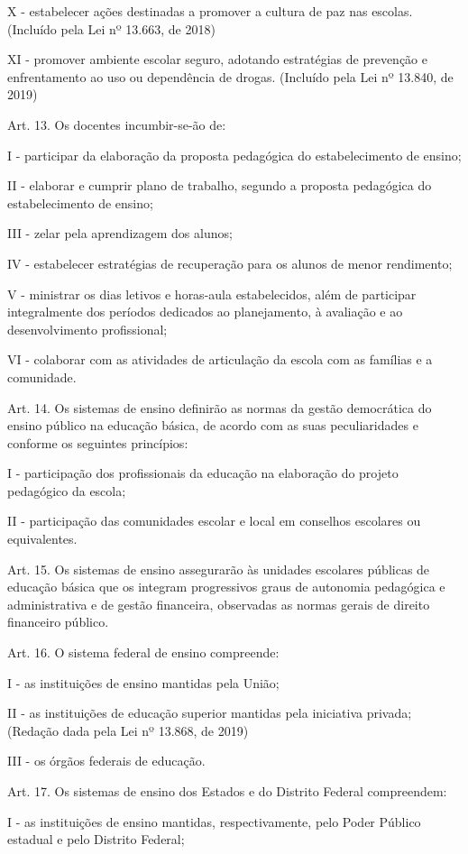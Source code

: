 \documentclass[
]{book}
\begin{document}
X - estabelecer ações destinadas a promover a cultura de paz nas escolas. (Incluído pela Lei nº 13.663, de 2018)

XI - promover ambiente escolar seguro, adotando estratégias de prevenção e enfrentamento ao uso ou dependência de drogas. (Incluído pela Lei nº 13.840, de 2019)

Art. 13. Os docentes incumbir-se-ão de:

I - participar da elaboração da proposta pedagógica do estabelecimento de ensino;

II - elaborar e cumprir plano de trabalho, segundo a proposta pedagógica do estabelecimento de ensino;

III - zelar pela aprendizagem dos alunos;

IV - estabelecer estratégias de recuperação para os alunos de menor rendimento;

V - ministrar os dias letivos e horas-aula estabelecidos, além de participar integralmente dos períodos dedicados ao planejamento, à avaliação e ao desenvolvimento profissional;

VI - colaborar com as atividades de articulação da escola com as famílias e a comunidade.

Art. 14. Os sistemas de ensino definirão as normas da gestão democrática do ensino público na educação básica, de acordo com as suas peculiaridades e conforme os seguintes princípios:

I - participação dos profissionais da educação na elaboração do projeto pedagógico da escola;

II - participação das comunidades escolar e local em conselhos escolares ou equivalentes.

Art. 15. Os sistemas de ensino assegurarão às unidades escolares públicas de educação básica que os integram progressivos graus de autonomia pedagógica e administrativa e de gestão financeira, observadas as normas gerais de direito financeiro público.

Art. 16. O sistema federal de ensino compreende:

I - as instituições de ensino mantidas pela União;

II - as instituições de educação superior mantidas pela iniciativa privada; (Redação dada pela Lei nº 13.868, de 2019)

III - os órgãos federais de educação.

Art. 17. Os sistemas de ensino dos Estados e do Distrito Federal compreendem:

I - as instituições de ensino mantidas, respectivamente, pelo Poder Público estadual e pelo Distrito Federal;
\end{document}
